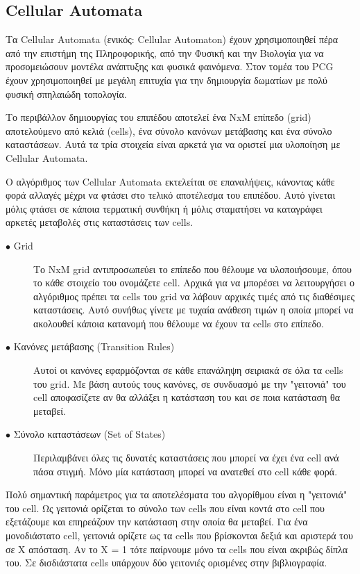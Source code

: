 \subsection{Cellular Automata}
Τα Cellular Automata (ενικός: Cellular Automaton) \cite{cellular} έχουν χρησιμοποιηθεί πέρα από την επιστήμη της Πληροφορικής, από την Φυσική και την Βιολογία για να προσομειώσουν μοντέλα ανάπτυξης και φυσικά φαινόμενα. Στον τομέα του PCG έχουν χρησιμοποιηθεί με μεγάλη επιτυχία για την δημιουργία δωματίων με πολύ φυσική σπηλαιώδη τοπολογία.
\par
Το περιβάλλον δημιουργίας του επιπέδου αποτελεί ένα NxM επίπεδο (grid) αποτελούμενο από κελιά (cells), ένα σύνολο κανόνων μετάβασης και ένα σύνολο καταστάσεων. Αυτά τα τρία στοιχεία είναι αρκετά για να οριστεί μια υλοποίηση με Cellular Automata. 
\par
 Ο αλγόριθμος των Cellular Automata εκτελείται σε επαναλήψεις, κάνοντας κάθε φορά αλλαγές μέχρι να φτάσει στο τελικό αποτέλεσμα του επιπέδου. Αυτό γίνεται μόλις φτάσει σε κάποια τερματική συνθήκη ή μόλις σταματήσει να καταγράφει αρκετές μεταβολές στις καταστάσεις των cells.
\begin{description}
  \item[$\bullet$ Grid] Το NxM grid αντιπροσωπεύει το επίπεδο που θέλουμε να υλοποιήσουμε, όπου το κάθε στοιχείο του ονομάζετε cell. Αρχικά για να μπορέσει να λειτουργήσει ο αλγόριθμος πρέπει τα cells του grid να λάβουν αρχικές τιμές από τις διαθέσιμες καταστάσεις. Αυτό συνήθως γίνετε με τυχαία ανάθεση τιμών η οποία μπορεί να ακολουθεί κάποια κατανομή που θέλουμε να έχουν τα cells στο επίπεδο.
  \item[$\bullet$ Κανόνες μετάβασης (Transition Rules)] Αυτοί οι κανόνες εφαρμόζονται σε κάθε επανάληψη σειριακά σε όλα τα cells του grid. Με βάση αυτούς τους κανόνες, σε συνδυασμό με την "γειτονιά" του cell αποφασίζετε αν θα αλλάξει η κατάσταση του και σε ποια κατάσταση θα μεταβεί.
    \item[$\bullet$ Σύνολο καταστάσεων (Set of States)] Περιλαμβάνει όλες τις δυνατές καταστάσεις που μπορεί να έχει ένα cell ανά πάσα στιγμή. Μόνο μία κατάσταση μπορεί να ανατεθεί στο cell κάθε φορά.
\end{description}
\par
Πολύ σημαντική παράμετρος για τα αποτελέσματα του αλγορίθμου είναι η "γειτονιά" του cell. Ως γειτονιά ορίζεται το σύνολο των cells που είναι κοντά στο cell που εξετάζουμε και επηρεάζουν την κατάσταση στην οποία θα μεταβεί. Για ένα μονοδιάστατο cell, γειτονιά ορίζετε ως τα cells που βρίσκονται δεξιά και αριστερά του σε X απόσταση. Αν το X = 1 τότε παίρνουμε μόνο τα cells που είναι ακριβώς δίπλα του. Σε δισδιάστατα cells υπάρχουν δύο γειτονιές ορισμένες στην βιβλιογραφία.
